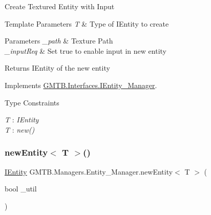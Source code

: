 Create Textured Entity with Input 


\begin{DoxyTemplParams}{Template Parameters}
{\em T} & Type of I\+Entity to create \\
\hline
\end{DoxyTemplParams}

\begin{DoxyParams}{Parameters}
{\em \+\_\+path} & Texture Path \\
\hline
{\em \+\_\+input\+Req} & Set true to enable input in new entity \\
\hline
\end{DoxyParams}
\begin{DoxyReturn}{Returns}
I\+Entity of the new entity 
\end{DoxyReturn}


Implements \mbox{\hyperlink{interface_g_m_t_b_1_1_interfaces_1_1_i_entity___manager}{G\+M\+T\+B.\+Interfaces.\+I\+Entity\+\_\+\+Manager}}.

\begin{Desc}
\item[Type Constraints]\begin{description}
\item[{\em T} : {\em I\+Entity}]\item[{\em T} : {\em new()}]\end{description}
\end{Desc}
\mbox{\label{class_g_m_t_b_1_1_managers_1_1_entity___manager_af5d50cb66d7a19322eb28029218d8cc9}} 
\subsubsection{\texorpdfstring{newEntity$<$ T $>$()}{newEntity< T >()}\hspace{0.1cm}{\footnotesize\ttfamily [4/5]}}
{\footnotesize\ttfamily \mbox{\hyperlink{interface_g_m_t_b_1_1_interfaces_1_1_i_entity}{I\+Entity}} G\+M\+T\+B.\+Managers.\+Entity\+\_\+\+Manager.\+new\+Entity$<$ T $>$ (\begin{DoxyParamCaption}\item[{bool}]{\+\_\+util }\end{DoxyParamCaption})}



